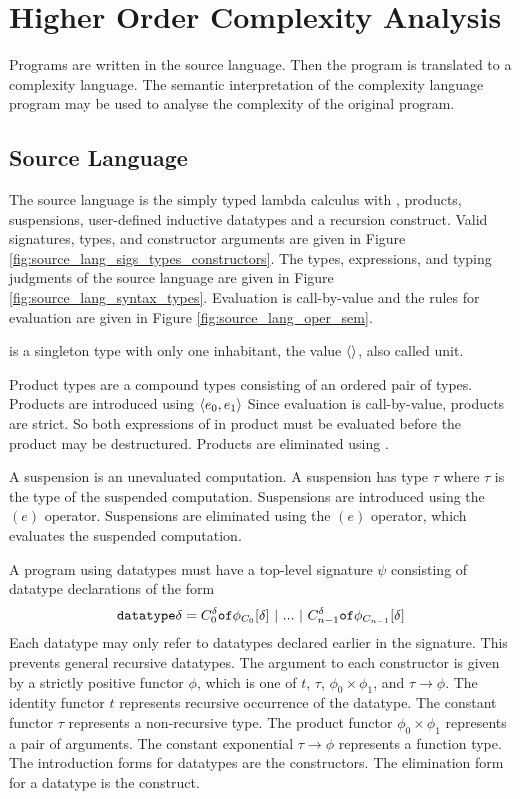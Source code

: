 \chapter{Higher Order Complexity Analysis}

Programs are written in the source language. Then the program is translated
to a complexity language. The semantic interpretation of the complexity
language program may be used to analyse the complexity of the original
program.

\section{Source Language}
The source language is the simply typed lambda calculus with ,
products, suspensions, user-defined inductive datatypes and a recursion
construct. Valid signatures, types, and constructor arguments are given in
Figure \ref{fig:source_lang_sigs_types_constructors}. The types, expressions,
and typing judgments of the source language are given in Figure
\ref{fig:source_lang_syntax_types}.  Evaluation is call-by-value and the rules
for evaluation are given in Figure \ref{fig:source_lang_oper_sem}.

 is a singleton type with only one inhabitant, the value
$\langle\rangle$, also called unit.

Product types are a compound types consisting of an ordered pair of types.
Products are introduced using $\langle e_0, e_1 \rangle$ Since evaluation is
call-by-value, products are strict.  So both expressions of in product must be
evaluated before the product may be destructured.  Products are eliminated
using .

A suspension is an unevaluated computation.  A suspension has type 
$\tau$ where $\tau$ is the type of the suspended computation.  Suspensions are
introduced using the $(e)$ operator.  Suspensions are eliminated using
the $(e)$ operator, which evaluates the suspended computation.


A program using datatypes must have a top-level signature $\psi$ consisting of
datatype declarations of the form
%
\[ \texttt{datatype} \delta = C^\delta_0 \texttt{of} \phi_{C_0}[\delta] \ |\ ...\ |\ C^\delta_{n-1} \texttt{of} \phi_{C_{n-1}}[\delta] \]
%
Each datatype may only refer to datatypes declared earlier in the signature.
This prevents general recursive datatypes.  The argument to each constructor is
given by a strictly positive functor $\phi$, which is one of $t$, $\tau$,
$\phi_0 \times \phi_1$, and $\tau \rightarrow \phi$.  The identity functor $t$
represents recursive occurrence of the datatype.  The constant functor $\tau$
represents a non-recursive type.  The product functor $\phi_0 \times \phi_1$
represents a pair of arguments.  The constant exponential $\tau \rightarrow \phi$
represents a function type.  The introduction forms for datatypes are the
constructors.  The elimination form for a datatype is the  construct.


